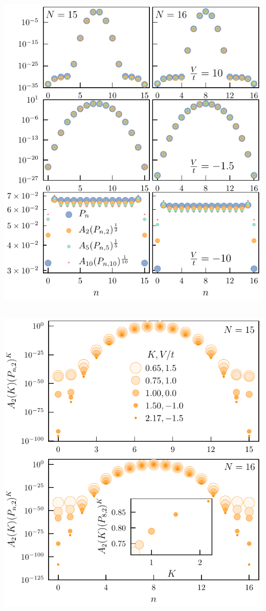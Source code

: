 	\subsection{}
		\includegraphics{alphaCollapse}

	\subsection{}
		\includegraphics{TLLCollapse}
				
